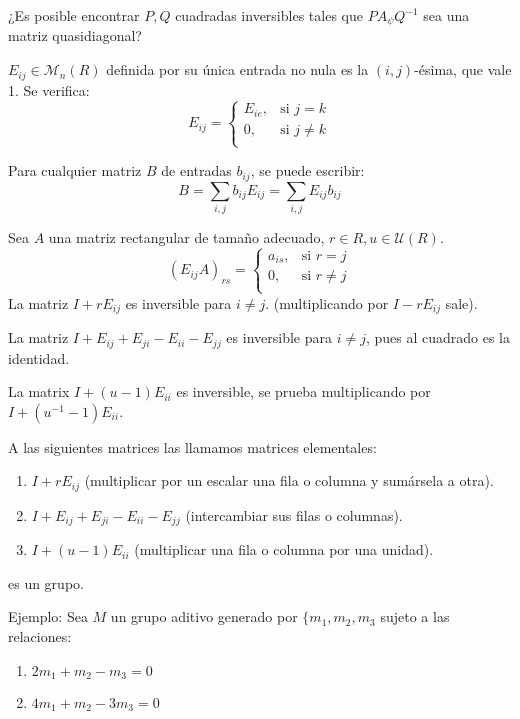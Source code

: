 ¿Es posible encontrar \(P,Q\) cuadradas inversibles tales que
\(PA_\psi Q^{-1}\) sea una matriz quasidiagonal?

\begin{df}
  \(E_{ij}\in\mathcal{M}_n(R)\) definida por su única entrada no nula es
  la \((i,j)\)-ésima, que vale 1.
  Se verifica:
  \[
    E_{ij}=\left\{
      \begin{matrix}
        E_{ie},&\textrm{si } j=k\\
        0,&\textrm{si } j\neq k\\
      \end{matrix}
      \right.
  \]

  Para cualquier matriz \(B\) de entradas \(b_{ij}\), se puede escribir:
  \[
    B=\sum_{i,j} b_{ij}E_{ij}=\sum_{i,j} E_{ij}b_{ij}
  \]

  Sea \(A\) una matriz rectangular de tamaño adecuado, \(r\in R,
  u\in\mathcal{U}(R)\).
  \[
    {(E_{ij}A)}_{rs}=\left\{
      \begin{matrix}
        a_{is},&\textrm{si } r=j\\
        0,&\textrm{si } r\neq j\\
      \end{matrix}
      \right.
  \]
  La matriz \(I+rE_{ij}\) es inversible para \(i\neq j\). (multiplicando
  por \(I-rE_{ij}\) sale).

  La matriz \(I+E_{ij}+E_{ji}-E_{ii}-E_{jj}\) es inversible para \(i\neq j\),
  pues al cuadrado es la identidad.

  La matrix \(I+(u-1)E_{ii}\) es inversible, se prueba multiplicando
  por \(I+(u^{-1}-1)E_{ii}\).

  A las siguientes matrices las llamamos matrices elementales:
  \begin{enumerate}
    \item \(I+rE_{ij}\) (multiplicar por un escalar una fila o columna
      y sumársela a otra).
    \item \(I+E_{ij}+E_{ji}-E_{ii}-E_{jj}\) (intercambiar sus filas o
      columnas).
    \item \(I+(u-1)E_{ii}\) (multiplicar una fila o columna por una unidad).
  \end{enumerate}
  es un grupo.
\end{df}

Ejemplo: Sea \(M\) un grupo aditivo generado por \(\{m_1,m_2,m_3\) sujeto
a las relaciones:
\begin{enumerate}
  \item \(2m_1+m_2-m_3=0\)
  \item \(4m_1+m_2-3m_3=0\)
\end{enumerate}

